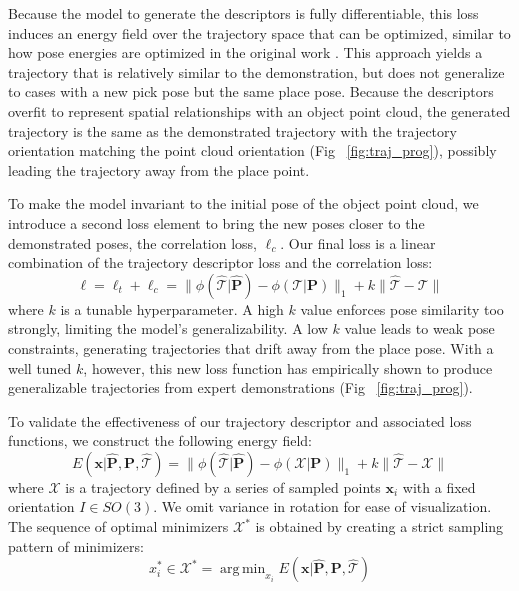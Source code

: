 \documentclass[10pt,twocolumn,letterpaper]{article}
\DeclareMathOperator*{\argmin}{arg\,min}
\begin{document}
Because the model to generate the descriptors is fully differentiable, this loss induces an energy field over the trajectory space that can be optimized, similar to how pose energies are optimized in the original work \cite{simeonovdu2021ndf}. This approach yields a trajectory that is relatively similar to the demonstration, but does not generalize to cases with a new pick pose but the same place pose. Because the descriptors overfit to represent spatial relationships with an object point cloud, the generated trajectory is the same as the demonstrated trajectory with the trajectory orientation matching the point cloud orientation (Fig ~\ref{fig:traj_prog}), possibly leading the trajectory away from the place point. 

To make the model invariant to the initial pose of the object point cloud, we introduce a second loss element to bring the new poses closer to the demonstrated poses, the correlation loss, $\ell_c$. Our final loss is a linear combination of the trajectory descriptor loss and the correlation loss:
\begin{equation}
\ell = \ell_t + \ell_c = \|\phi(\hat{\mathcal{T}}|\hat{\mathbf{P}}) - \phi(\mathcal{T}|\mathbf{P})\|_1 + k\|\hat{\mathcal{T}} - \mathcal{T}\|
\end{equation}
where $k$ is a tunable hyperparameter. A high $k$ value enforces pose similarity too strongly, limiting the model's generalizability. A low $k$ value leads to weak pose constraints, generating trajectories that drift away from the place pose. With a well tuned $k$, however, this new loss function has empirically shown to produce generalizable trajectories from expert demonstrations (Fig ~\ref{fig:traj_prog}).

To validate the effectiveness of our trajectory descriptor and associated loss functions, we construct the following energy field:
\begin{equation}
    E(\mathbf{x}|\hat{\mathbf{P}},\mathbf{P},\hat{\mathcal{T}}) = \|\phi(\hat{\mathcal{T}}|\hat{\mathbf{P}}) - \phi(\mathcal{X}|\mathbf{P})\|_1 + k\|\hat{\mathcal{T}} - \mathcal{X}\|
    \end{equation}
where $\mathcal{X}$ is a trajectory defined by a series of sampled points $\mathbf{x}_i$ with a fixed orientation $I \in SO(3)$. We omit variance in rotation for ease of visualization. The sequence of optimal minimizers $\mathcal{X}^*$ is obtained by creating a strict sampling pattern of minimizers:
\begin{equation}
    x^*_i \in \mathcal{X}^* = \argmin_{x_i} E(\mathbf{x}|\hat{\mathbf{P}},\mathbf{P},\hat{\mathcal{T}})
\end{equation}
\end{document}
